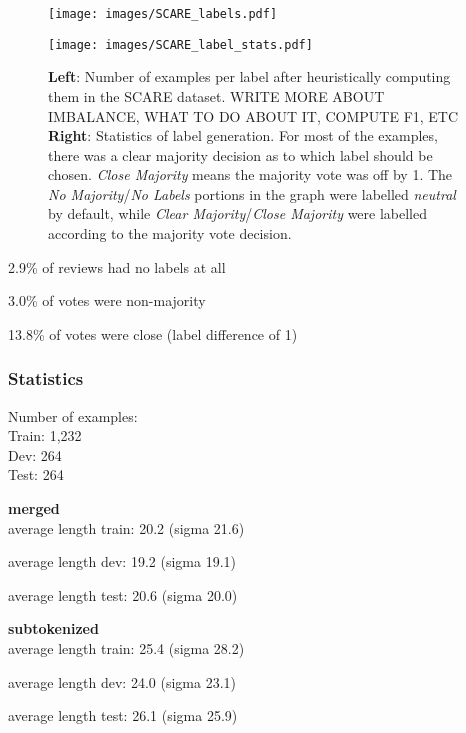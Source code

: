 \begin{figure}
  \begin{minipage}{0.45\linewidth}
  \vspace{0pt}
    \texttt{[image: images/SCARE\_labels.pdf]}
  \end{minipage}
  \hfill
  \begin{minipage}{0.45\linewidth}
  \vspace{0pt}
    \texttt{[image: images/SCARE\_label\_stats.pdf]}
  \end{minipage}
  \caption[Accumulated Gains and Losses.]{\textbf{Left}: Number of examples per label after heuristically computing them in the SCARE dataset. {\color{red} WRITE MORE ABOUT IMBALANCE, WHAT TO DO ABOUT IT, COMPUTE F1, ETC} \textbf{Right}: Statistics of label generation. For most of the examples, there was a clear majority decision as to which label should be chosen. \emph{Close Majority} means the majority vote was off by 1. The \emph{No Majority}/\emph{No Labels} portions in the graph were labelled \emph{neutral} by default, while \emph{Clear Majority}/\emph{Close Majority}  were labelled according to the majority vote decision.}
\end{figure}

2.9\% of reviews had no labels at all

3.0\% of votes were non-majority

13.8\% of votes were close (label difference of 1)

\subsubsection{Statistics}

Number of examples: \\
Train: 1,232 \\
Dev: 264 \\
Test: 264

\textbf{merged} \\
average length train: 20.2 (sigma 21.6)

average length dev: 19.2 (sigma 19.1)

average length test: 20.6 (sigma 20.0)

\textbf{subtokenized} \\

average length train: 25.4 (sigma 28.2)

average length dev: 24.0 (sigma 23.1)

average length test: 26.1 (sigma 25.9)


